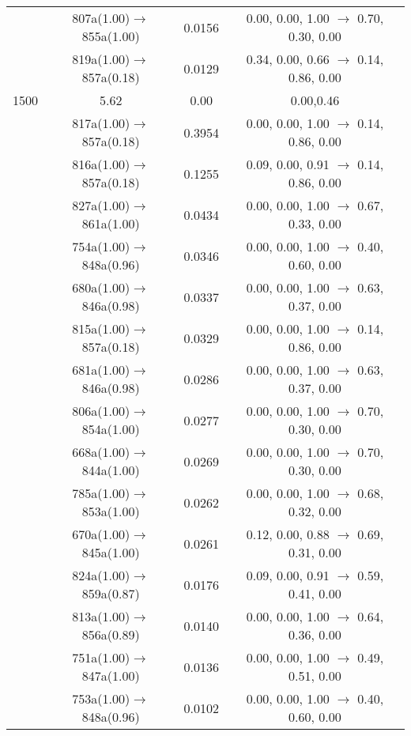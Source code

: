 \documentclass[10pt,a4paper]{article}
\begin{document}
\begin{longtable}{c|c|c|c}
 	& 807a(1.00)$\rightarrow$855a(1.00) &	 0.0156 &	 0.00, 0.00, 1.00 $\rightarrow$ 0.70, 0.30, 0.00 \\ 
 	& 819a(1.00)$\rightarrow$857a(0.18) &	 0.0129 &	 0.34, 0.00, 0.66 $\rightarrow$ 0.14, 0.86, 0.00 \\ 
 \hline1500 &	 5.62 &	 0.00 &	 0.00,0.46 \\ 
  	& 817a(1.00)$\rightarrow$857a(0.18) &	 0.3954 &	 0.00, 0.00, 1.00 $\rightarrow$ 0.14, 0.86, 0.00 \\ 
 	& 816a(1.00)$\rightarrow$857a(0.18) &	 0.1255 &	 0.09, 0.00, 0.91 $\rightarrow$ 0.14, 0.86, 0.00 \\ 
 	& 827a(1.00)$\rightarrow$861a(1.00) &	 0.0434 &	 0.00, 0.00, 1.00 $\rightarrow$ 0.67, 0.33, 0.00 \\ 
 	& 754a(1.00)$\rightarrow$848a(0.96) &	 0.0346 &	 0.00, 0.00, 1.00 $\rightarrow$ 0.40, 0.60, 0.00 \\ 
 	& 680a(1.00)$\rightarrow$846a(0.98) &	 0.0337 &	 0.00, 0.00, 1.00 $\rightarrow$ 0.63, 0.37, 0.00 \\ 
 	& 815a(1.00)$\rightarrow$857a(0.18) &	 0.0329 &	 0.00, 0.00, 1.00 $\rightarrow$ 0.14, 0.86, 0.00 \\ 
 	& 681a(1.00)$\rightarrow$846a(0.98) &	 0.0286 &	 0.00, 0.00, 1.00 $\rightarrow$ 0.63, 0.37, 0.00 \\ 
 	& 806a(1.00)$\rightarrow$854a(1.00) &	 0.0277 &	 0.00, 0.00, 1.00 $\rightarrow$ 0.70, 0.30, 0.00 \\ 
 	& 668a(1.00)$\rightarrow$844a(1.00) &	 0.0269 &	 0.00, 0.00, 1.00 $\rightarrow$ 0.70, 0.30, 0.00 \\ 
 	& 785a(1.00)$\rightarrow$853a(1.00) &	 0.0262 &	 0.00, 0.00, 1.00 $\rightarrow$ 0.68, 0.32, 0.00 \\ 
 	& 670a(1.00)$\rightarrow$845a(1.00) &	 0.0261 &	 0.12, 0.00, 0.88 $\rightarrow$ 0.69, 0.31, 0.00 \\ 
 	& 824a(1.00)$\rightarrow$859a(0.87) &	 0.0176 &	 0.09, 0.00, 0.91 $\rightarrow$ 0.59, 0.41, 0.00 \\ 
 	& 813a(1.00)$\rightarrow$856a(0.89) &	 0.0140 &	 0.00, 0.00, 1.00 $\rightarrow$ 0.64, 0.36, 0.00 \\ 
 	& 751a(1.00)$\rightarrow$847a(1.00) &	 0.0136 &	 0.00, 0.00, 1.00 $\rightarrow$ 0.49, 0.51, 0.00 \\ 
 	& 753a(1.00)$\rightarrow$848a(0.96) &	 0.0102 &	 0.00, 0.00, 1.00 $\rightarrow$ 0.40, 0.60, 0.00 \\ 
 \hline %
 \end{longtable} 
 
\end{document}
